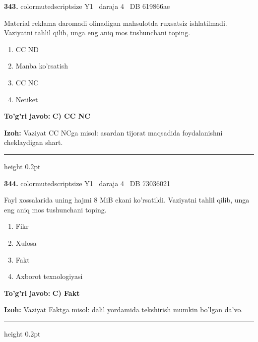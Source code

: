 \documentclass[10pt,a4paper,oneside]{article}
\begin{document}
\noindent\textbf{\color{ink}343.}  {color{muted}scriptsize Y1 \textbullet\ daraja 4 \textbullet\ DB 619866ae}
\par
Material reklama daromadi olinadigan mahsulotda ruxsatsiz ishlatilmadi. Vaziyatni tahlil qilib, unga eng aniq mos tushunchani toping.
\begin{enumerate}[label=\Alph*),leftmargin=9mm]
\item CC ND
\item Manba ko'rsatish
\item CC NC
\item Netiket
\end{enumerate}
\begin{tcolorbox}[enhanced,breakable,colback=teal!4,colframe=teal!50!black,boxrule=0.5pt,arc=1.1mm,left=3mm,right=3mm,top=1.7mm,bottom=1.7mm,before skip=2mm,after skip=2mm]
\textbf{\color{teal}To'g'ri javob:} \textbf{C) CC NC}
\par\smallskip
\textbf{Izoh:} Vaziyat CC NCga misol: asardan tijorat maqsadida foydalanishni cheklaydigan shart.
\end{tcolorbox}
\vspace{2mm}\hrule height 0.2pt \vspace{3mm}

\noindent\textbf{\color{ink}344.}  {color{muted}scriptsize Y1 \textbullet\ daraja 4 \textbullet\ DB 73036021}
\par
Fayl xossalarida uning hajmi 8 MiB ekani ko'rsatildi. Vaziyatni tahlil qilib, unga eng aniq mos tushunchani toping.
\begin{enumerate}[label=\Alph*),leftmargin=9mm]
\item Fikr
\item Xulosa
\item Fakt
\item Axborot texnologiyasi
\end{enumerate}
\begin{tcolorbox}[enhanced,breakable,colback=teal!4,colframe=teal!50!black,boxrule=0.5pt,arc=1.1mm,left=3mm,right=3mm,top=1.7mm,bottom=1.7mm,before skip=2mm,after skip=2mm]
\textbf{\color{teal}To'g'ri javob:} \textbf{C) Fakt}
\par\smallskip
\textbf{Izoh:} Vaziyat Faktga misol: dalil yordamida tekshirish mumkin bo'lgan da'vo.
\end{tcolorbox}
\vspace{2mm}\hrule height 0.2pt \vspace{3mm}
\end{document}
